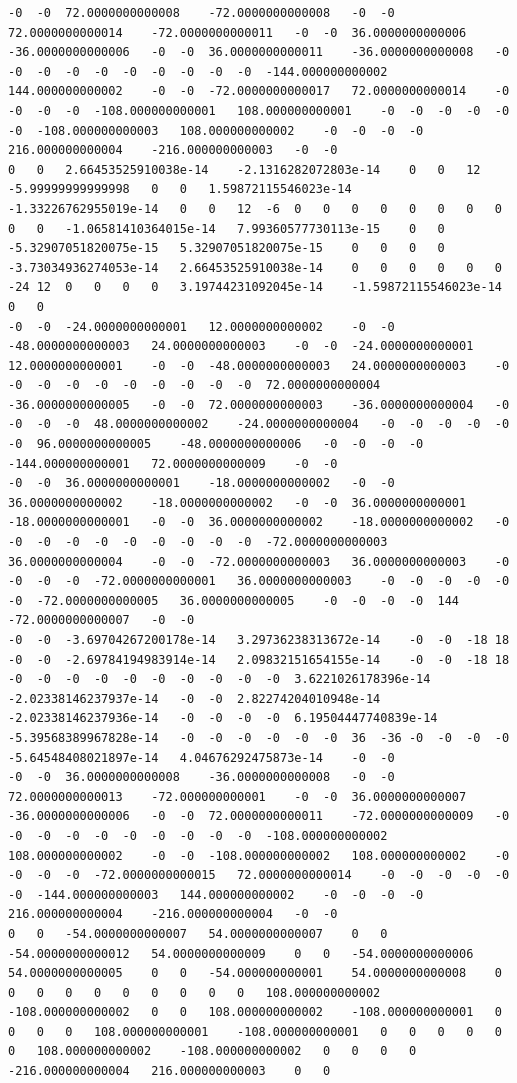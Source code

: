 \documentclass[12pt]{report} %
\begin{document}
\begin{landscape}
\begin{lstlisting}[numbers=none, basicstyle=\ttfamily\tiny, captionpos=b, caption={Matriz de coeficientes $W = G^{-1}$ ($54\times54$) calculada con MATLAB, sin redondear.}, label=cod:W-matlab]
-0	-0	72.0000000000008	-72.0000000000008	-0	-0	72.0000000000014	-72.0000000000011	-0	-0	36.0000000000006	-36.0000000000006	-0	-0	36.0000000000011	-36.0000000000008	-0	-0	-0	-0	-0	-0	-0	-0	-0	-0	-144.000000000002	144.000000000002	-0	-0	-72.0000000000017	72.0000000000014	-0	-0	-0	-0	-108.000000000001	108.000000000001	-0	-0	-0	-0	-0	-0	-108.000000000003	108.000000000002	-0	-0	-0	-0	216.000000000004	-216.000000000003	-0	-0
0	0	2.66453525910038e-14	-2.1316282072803e-14	0	0	12	-5.99999999999998	0	0	1.59872115546023e-14	-1.33226762955019e-14	0	0	12	-6	0	0	0	0	0	0	0	0	0	0	-1.06581410364015e-14	7.99360577730113e-15	0	0	-5.32907051820075e-15	5.32907051820075e-15	0	0	0	0	-3.73034936274053e-14	2.66453525910038e-14	0	0	0	0	0	0	-24	12	0	0	0	0	3.19744231092045e-14	-1.59872115546023e-14	0	0
-0	-0	-24.0000000000001	12.0000000000002	-0	-0	-48.0000000000003	24.0000000000003	-0	-0	-24.0000000000001	12.0000000000001	-0	-0	-48.0000000000003	24.0000000000003	-0	-0	-0	-0	-0	-0	-0	-0	-0	-0	72.0000000000004	-36.0000000000005	-0	-0	72.0000000000003	-36.0000000000004	-0	-0	-0	-0	48.0000000000002	-24.0000000000004	-0	-0	-0	-0	-0	-0	96.0000000000005	-48.0000000000006	-0	-0	-0	-0	-144.000000000001	72.0000000000009	-0	-0
-0	-0	36.0000000000001	-18.0000000000002	-0	-0	36.0000000000002	-18.0000000000002	-0	-0	36.0000000000001	-18.0000000000001	-0	-0	36.0000000000002	-18.0000000000002	-0	-0	-0	-0	-0	-0	-0	-0	-0	-0	-72.0000000000003	36.0000000000004	-0	-0	-72.0000000000003	36.0000000000003	-0	-0	-0	-0	-72.0000000000001	36.0000000000003	-0	-0	-0	-0	-0	-0	-72.0000000000005	36.0000000000005	-0	-0	-0	-0	144	-72.0000000000007	-0	-0
-0	-0	-3.69704267200178e-14	3.29736238313672e-14	-0	-0	-18	18	-0	-0	-2.69784194983914e-14	2.09832151654155e-14	-0	-0	-18	18	-0	-0	-0	-0	-0	-0	-0	-0	-0	-0	3.6221026178396e-14	-2.02338146237937e-14	-0	-0	2.82274204010948e-14	-2.02338146237936e-14	-0	-0	-0	-0	6.19504447740839e-14	-5.39568389967828e-14	-0	-0	-0	-0	-0	-0	36	-36	-0	-0	-0	-0	-5.64548408021897e-14	4.04676292475873e-14	-0	-0
-0	-0	36.0000000000008	-36.0000000000008	-0	-0	72.0000000000013	-72.000000000001	-0	-0	36.0000000000007	-36.0000000000006	-0	-0	72.0000000000011	-72.0000000000009	-0	-0	-0	-0	-0	-0	-0	-0	-0	-0	-108.000000000002	108.000000000002	-0	-0	-108.000000000002	108.000000000002	-0	-0	-0	-0	-72.0000000000015	72.0000000000014	-0	-0	-0	-0	-0	-0	-144.000000000003	144.000000000002	-0	-0	-0	-0	216.000000000004	-216.000000000004	-0	-0
0	0	-54.0000000000007	54.0000000000007	0	0	-54.0000000000012	54.0000000000009	0	0	-54.0000000000006	54.0000000000005	0	0	-54.000000000001	54.0000000000008	0	0	0	0	0	0	0	0	0	0	108.000000000002	-108.000000000002	0	0	108.000000000002	-108.000000000001	0	0	0	0	108.000000000001	-108.000000000001	0	0	0	0	0	0	108.000000000002	-108.000000000002	0	0	0	0	-216.000000000004	216.000000000003	0	0

\end{lstlisting}
\end{landscape}
\end{document}

